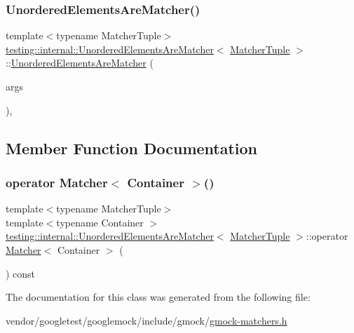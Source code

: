\subsubsection{\texorpdfstring{Unordered\+Elements\+Are\+Matcher()}{UnorderedElementsAreMatcher()}}
{\footnotesize\ttfamily template$<$typename Matcher\+Tuple$>$ \\
\hyperlink{classtesting_1_1internal_1_1_unordered_elements_are_matcher}{testing\+::internal\+::\+Unordered\+Elements\+Are\+Matcher}$<$ \hyperlink{structtesting_1_1internal_1_1_matcher_tuple}{Matcher\+Tuple} $>$\+::\hyperlink{classtesting_1_1internal_1_1_unordered_elements_are_matcher}{Unordered\+Elements\+Are\+Matcher} (\begin{DoxyParamCaption}\item[{const \hyperlink{structtesting_1_1internal_1_1_matcher_tuple}{Matcher\+Tuple} \&}]{args }\end{DoxyParamCaption})\hspace{0.3cm}{\ttfamily [inline]}, {\ttfamily [explicit]}}



\subsection{Member Function Documentation}
\mbox{\label{classtesting_1_1internal_1_1_unordered_elements_are_matcher_a5191cb321191985e257225b9a5df95f5}} 
\subsubsection{\texorpdfstring{operator Matcher$<$ Container $>$()}{operator Matcher< Container >()}}
{\footnotesize\ttfamily template$<$typename Matcher\+Tuple$>$ \\
template$<$typename Container $>$ \\
\hyperlink{classtesting_1_1internal_1_1_unordered_elements_are_matcher}{testing\+::internal\+::\+Unordered\+Elements\+Are\+Matcher}$<$ \hyperlink{structtesting_1_1internal_1_1_matcher_tuple}{Matcher\+Tuple} $>$\+::operator \hyperlink{classtesting_1_1_matcher}{Matcher}$<$ Container $>$ (\begin{DoxyParamCaption}{ }\end{DoxyParamCaption}) const\hspace{0.3cm}{\ttfamily [inline]}}



The documentation for this class was generated from the following file\+:\begin{DoxyCompactItemize}
\item 
vendor/googletest/googlemock/include/gmock/\hyperlink{gmock-matchers_8h}{gmock-\/matchers.\+h}\end{DoxyCompactItemize}
